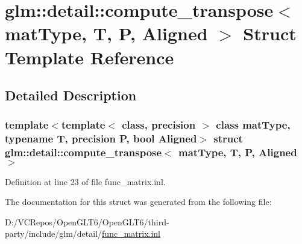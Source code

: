\hypertarget{structglm_1_1detail_1_1compute__transpose}{}\section{glm\+::detail\+::compute\+\_\+transpose$<$ mat\+Type, T, P, Aligned $>$ Struct Template Reference}
\label{structglm_1_1detail_1_1compute__transpose}


\subsection{Detailed Description}
\subsubsection*{template$<$template$<$ class, precision $>$ class mat\+Type, typename T, precision P, bool Aligned$>$\newline
struct glm\+::detail\+::compute\+\_\+transpose$<$ mat\+Type, T, P, Aligned $>$}



Definition at line 23 of file func\+\_\+matrix.\+inl.



The documentation for this struct was generated from the following file\+:\begin{DoxyCompactItemize}
\item 
D\+:/\+V\+C\+Repos/\+Open\+G\+L\+T6/\+Open\+G\+L\+T6/third-\/party/include/glm/detail/\mbox{\hyperlink{func__matrix_8inl}{func\+\_\+matrix.\+inl}}\end{DoxyCompactItemize}
